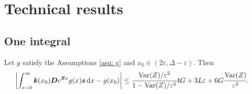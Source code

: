 \section{Technical results}
\subsection{One integral}
\begin{lem} \label{lem:tttttt}
	Let \(g\) satisfy the Assumptions \ref{asu: g} and \(x_0\in(2\varepsilon,\Delta-\varepsilon)\). Then
	\begin{align}
		\left|\int_{x=0}^\infty \boldsymbol k(x_0)\boldsymbol De^{\boldsymbol Sx}g(x)\boldsymbol s\, \mathrm{d} x - g(x_0)\right| \leq \cfrac{\mathrm{Var}(Z)/\varepsilon^2}{1-\mathrm{Var}(Z)/\varepsilon^2}4G + 3L\varepsilon+6G\cfrac{\mathrm{Var}(Z)}{\varepsilon^2}.
	\end{align}
\end{lem}
